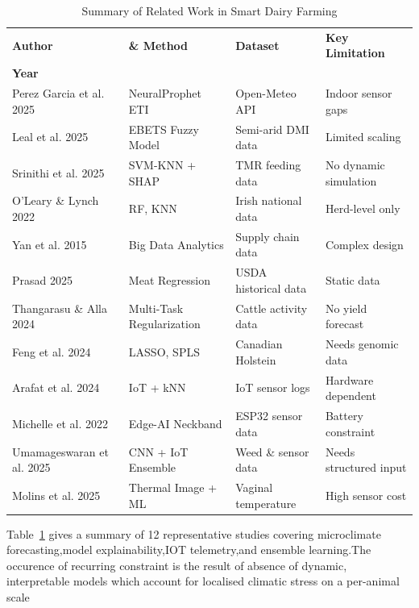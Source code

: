 \documentclass[conference]{IEEEtran}
\begin{document}
\begin{table}[!ht]
		\caption{Summary of Related Work in Smart Dairy Farming}
		\label{tab:related_work}
		\centering
		\footnotesize
		\setlength{\tabcolsep}{3pt}
		\begin{tabular}{p{2.0cm} p{2.1cm} p{1.3cm} p{2.6cm}}
			\toprule
			\textbf{Author} & \textbf{\& Method} & \textbf{Dataset} & \textbf{Key Limitation} \\
			\textbf{Year} & & & \\
			\midrule
			Perez Garcia et al. 2025 \cite{ref1} & NeuralProphet ETI & Open-Meteo API & Indoor sensor gaps \\
			Leal et al. 2025 \cite{ref2} & EBETS Fuzzy Model & Semi-arid DMI data & Limited scaling \\
			Srinithi et al. 2025 \cite{ref3} & SVM-KNN + SHAP & TMR feeding data & No dynamic simulation \\
			O'Leary \& Lynch 2022 \cite{ref4} & RF, KNN & Irish national data & Herd-level only \\
			Yan et al. 2015 \cite{ref5} & Big Data Analytics & Supply chain data & Complex design \\
			Prasad 2025 \cite{ref6} & Meat Regression & USDA historical data & Static data \\
			Thangarasu \& Alla 2024 \cite{ref7} & Multi-Task Regularization & Cattle activity data & No yield forecast \\
			Feng et al. 2024 \cite{ref8} & LASSO, SPLS & Canadian Holstein & Needs genomic data \\
			Arafat et al. 2024 \cite{ref9} & IoT + kNN & IoT sensor logs & Hardware dependent \\
			Michelle et al. 2022 \cite{ref10} & Edge-AI Neckband & ESP32 sensor data & Battery constraint \\
			Umamageswaran et al. 2025 \cite{ref11} & CNN + IoT Ensemble & Weed \& sensor data & Needs structured input \\
			Molins et al. 2025 \cite{ref12} & Thermal Image + ML & Vaginal temperature & High sensor cost \\
			\bottomrule
		\end{tabular}
	\end{table}
	Table~\ref{tab:related_work} gives a summary of 12 representative studies covering microclimate forecasting,model explainability,IOT telemetry,and ensemble learning.The occurence of recurring constraint is the result of absence of dynamic, interpretable models which account for localised climatic stress on a per-animal scale
	
\end{document}
